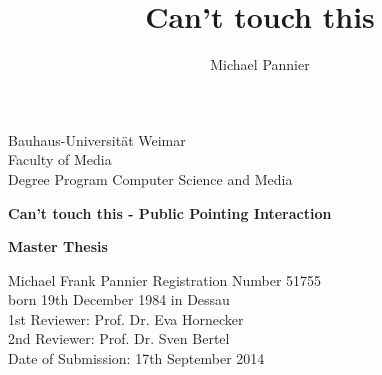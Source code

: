 
\begin{titlepage}
\large
\noindent
Bauhaus-Universität Weimar\\
Faculty of Media\\
Degree Program Computer Science and Media\\
\author{Michael Pannier}
\title{Can't touch this}
\vspace{25mm}
\begin{center}
    \huge{\bfseries{Can't touch this - Public Pointing Interaction}}
\end{center}
\vspace{15mm}
\begin{center}
    \huge{\bfseries{Master Thesis}}\\
\end{center}
\vspace{25mm}
Michael Frank Pannier
\hfill Registration Number 51755\\
born 19th December 1984 in Dessau\\
\newline
\newline
1st Reviewer: Prof. Dr. Eva Hornecker\\
2nd Reviewer: Prof. Dr. Sven Bertel\\
\vfill
\noindent
Date of Submission: 17th September 2014\\
\end{titlepage}

